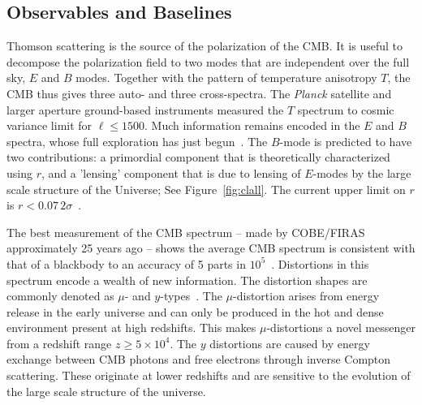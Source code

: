 
\subsection{Observables and Baselines}
\label{sec:observables}

\vspace{-0.05in}

Thomson scattering is the source of the polarization of the \ac{CMB}. It is useful 
to decompose the polarization field to two modes that are independent over the full sky, $E$ and $B$ modes. 
Together with the pattern of temperature anisotropy $T$, the \ac{CMB} thus gives three auto- and three cross-spectra. 
The {\it Planck} satellite and larger aperture ground-based instruments measured the $T$ spectrum to cosmic
variance limit for $\ell \leq 1500$. Much information remains encoded in the $E$ and $B$ spectra, whose full exploration 
has just begun~\cite{planck2015parameters, Hanson2013,PB_BB,bicep2Bmode, bkp2015}.  
The $B$-mode is predicted to have two contributions: a primordial component that is theoretically characterized 
using $r$, and a 'lensing' component that is due to lensing of $E$-modes by the large scale structure
of the Universe; See Figure~\ref{fig:clall}. The current upper limit on $r$ is $r<0.07\, 2\sigma$~\cite{Array:2015xqh}.


The best measurement of the \ac{CMB} spectrum -- made by COBE/FIRAS approximately 25 years ago --
shows the average CMB spectrum is consistent with that of a blackbody to an accuracy of 5 parts 
in $10^{5}$~\cite{Mather1994, Fixsen1996}. Distortions in this spectrum encode a wealth of new information.
The distortion shapes are commonly denoted as $\mu$- and $y$-types~\cite{Zeldovich1969, Sunyaev1970mu}. The 
$\mu$-distortion arises from energy release in the early universe and can only be produced in the hot and dense 
environment present at high redshifts. This makes $\mu$-distortions a novel messenger from a redshift 
range $ z \geq 5\times10^{4} $. The $y$ distortions are caused by 
energy exchange between \ac{CMB} photons and free electrons through inverse Compton 
scattering. These originate at lower redshifts and are sensitive to the 
evolution of the large scale structure of the universe. 

